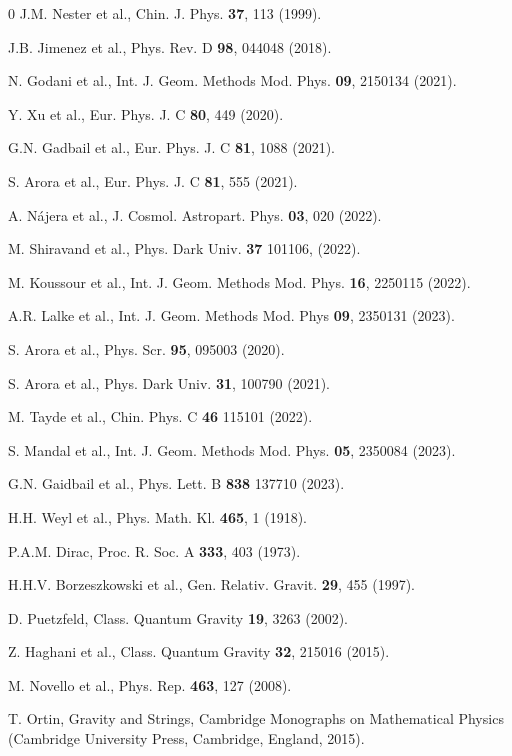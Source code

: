 \documentclass[showpacs,aps,amssymb,preprintnumbers,prd,amsmath,floatfix]{revtex4}
\begin{document}
\begin{thebibliography}{0}
J.M. Nester et al., Chin. J. Phys. \textbf{37}, 113 (1999).

J.B. Jimenez et al., Phys. Rev. D \textbf{98}, 044048 (2018).

N. Godani et al., Int. J. Geom. Methods Mod. Phys. \textbf{09}, 2150134 (2021).

Y. Xu et al., Eur. Phys. J. C \textbf{80}, 449 (2020).

G.N. Gadbail et al., Eur. Phys. J. C \textbf{81}, 1088 (2021).

S. Arora et al., Eur. Phys. J. C \textbf{81}, 555 (2021).

A. Nájera et al., J. Cosmol. Astropart. Phys. \textbf{03}, 020 (2022).

M. Shiravand et al., Phys. Dark Univ. \textbf{37} 101106, (2022).

M. Koussour et al., Int. J. Geom. Methods Mod. Phys. \textbf{16}, 2250115 (2022).

 
A.R. Lalke et al., Int. J. Geom. Methods Mod. Phys \textbf{09}, 2350131 (2023).

S. Arora et al., Phys. Scr. \textbf{95}, 095003 (2020).

S. Arora et al., Phys. Dark Univ. \textbf{31}, 100790 (2021).

M. Tayde et al., Chin. Phys. C \textbf{46} 115101 (2022). 

S. Mandal et al., Int. J. Geom. Methods Mod. Phys. \textbf{05}, 2350084 (2023).

 G.N. Gaidbail et al., Phys. Lett. B \textbf{838} 137710 (2023).
 
H.H. Weyl et al., Phys. Math. Kl. \textbf{465}, 1 (1918).

P.A.M. Dirac, Proc. R. Soc. A \textbf{333}, 403 (1973).


H.H.V. Borzeszkowski et al., Gen. Relativ. Gravit. \textbf{29}, 455 (1997).

D. Puetzfeld, Class. Quantum Gravity \textbf{19}, 3263 (2002).

Z. Haghani et al., Class. Quantum Gravity \textbf{32}, 215016 (2015).

M. Novello et al., Phys. Rep. \textbf{463}, 127 (2008).

T. Ortin, Gravity and Strings, Cambridge Monographs on Mathematical Physics (Cambridge University Press, Cambridge, England, 2015).


\end{thebibliography}
\end{document}
